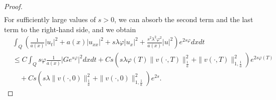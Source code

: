 \documentclass[reqno]{amsart}
\theoremstyle{plain}
\theoremstyle{remark}
\numberwithin{equation}{section}
\begin{document}
\begin{proof}
\begin{equation*}
\begin{split}
    \end{split}
\end{equation*}
For sufficiently large values of  $s>0$, we can absorb the second term and the last term to the right-hand side, and we obtain
\begin{align*}
    &\int_{Q} \left(\frac{1}{a(x)}\vert u_{t}\vert^2+ a(x)\vert u_{xx}\vert^2+ s\lambda \varphi \vert u_{x}\vert^2+ \frac{s^2\lambda^2\varphi^2}{a(x)}\vert u\vert^2\right)e^{2s\varphi}dxdt\\&\leqslant C  \int_{Q}s\varphi\frac{1}{a(x)}\vert Ge^{s\varphi}\vert^2 dxdt +C s\left( s\lambda\varphi(T)\| v(\cdot,T)\|_{\frac{1}{a}}^2+\| v(\cdot,T)\|_{1,\frac{1}{a}}^2 \right)e^{2s\varphi(T)}\\&\quad +Cs\left( s\lambda\| v(\cdot,0)\|_{\frac{1}{a}}^2+\| v(\cdot,0)\|_{1,\frac{1}{a}}^2\right)e^{2s}.
\end{align*}
\end{proof}
\end{document}
